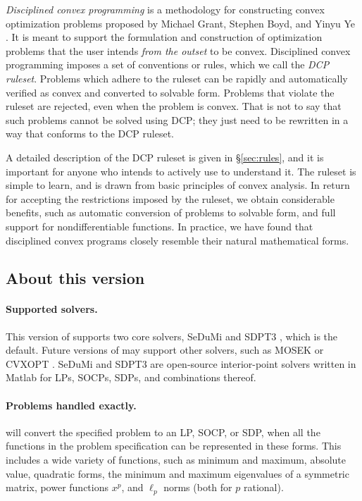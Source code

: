 \documentclass[12pt]{article}
\begin{document}
\emph{Disciplined convex programming} is
a methodology for constructing convex optimization problems
proposed by Michael Grant, Stephen Boyd, and Yinyu Ye \cite{GBY,Gra:04}.
It is meant to support the formulation and
construction of optimization problems that the user 
intends \emph{from the outset} to be convex.
Disciplined convex programming imposes a
set of conventions or rules, which we call the \emph{DCP ruleset}.
Problems which adhere to the ruleset can be rapidly and automatically
verified as convex and converted to solvable form.
Problems that violate the ruleset are rejected, even 
when the problem is convex.
That is not to say that such problems cannot be solved using DCP; they
just need to be rewritten in a way that conforms to the DCP ruleset.

A detailed description of the DCP ruleset is given in \S\ref{sec:rules},
and it is important for anyone who intends to actively use
\cvx to understand it.
The ruleset is simple 
to learn, and is drawn from basic principles of convex analysis.
In return for accepting the restrictions imposed by the ruleset,
we obtain considerable benefits, such as automatic conversion of
problems to solvable form, and full support for nondifferentiable 
functions. 
In practice, we have found that
disciplined convex programs closely resemble
their natural mathematical forms.

\subsection{About this version}
\label{sec:version}
\paragraph{Supported solvers.}
This version of \cvx supports two core solvers, SeDuMi
\cite{Stu:99} and SDPT3 \cite{SDPT3}, which is the default.
Future versions of \cvx may support other solvers, such as
MOSEK \cite{MOSEK} or CVXOPT \cite{CVXOPT}.
SeDuMi and SDPT3 are open-source interior-point solvers written in Matlab for 
LPs, SOCPs, SDPs, and combinations thereof.

\paragraph{Problems handled exactly.}
\cvx will convert the specified problem to an LP, SOCP, or SDP,
when all the functions in the problem specification can be
represented in these forms.
This includes a wide variety of functions, such as minimum and
maximum, absolute value, quadratic forms, 
the minimum and maximum eigenvalues of a symmetric matrix,
power functions $x^p$, and $\ell_p$ norms (both for $p$ rational).
\end{document}

